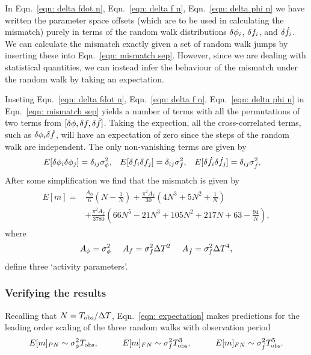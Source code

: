 In Eqn.~\eqref{eqn: delta fdot n}, Eqn.~\eqref{eqn: delta f n},
Eqn.~\eqref{eqn: delta phi n} we have written the parameter space offsets
(which are to be used in calculating the mismatch) purely in terms of the
random walk distributions $\delta \phi_i$, $\delta f_i$, and $\delta \dot{f}_i$. We can
calculate the mismatch exactly given a set of random walk jumps by inserting
these into Eqn.~\eqref{eqn: mismatch sep}. However, since we are dealing with
statistical quantities, we can instead infer the behaviour of the mismatch
under the random walk by taking an expectation.

Inseting Eqn.~\eqref{eqn: delta fdot n}, Eqn.~\eqref{eqn: delta f n},
Eqn.~\eqref{eqn: delta phi n}  in Eqn.~\eqref{eqn: mismatch sep} yields a
number of terms with all the permutations of two terms from $[\delta \phi, \delta f,
\delta \dot{f}]$. Taking the expection, all the cross-correlated terms, such as
$\delta\phi_{i}\delta \dot{f}$, will have an expectation of zero since the steps of the
random walk are independent. The only non-vanishing terms are given by
\begin{align}
E[\delta\phi_{i}\delta\phi_{j}] &= \delta_{ij}\sigma_{\phi}^{2}, &
E[\delta f_{i}\delta f_{j}] &= \delta_{ij}\sigma_{f}^{2},&
E[\delta\dot{f}_{i}\delta\dot{f}_{j}] &= \delta_{ij}\sigma_{\dot{f}}^{2},
\end{align}
After some simplification we find that the mismatch is given by
\begin{align}
\begin{split}
E[m]   = &  \frac{A_{\phi}}{6} \left(N - \frac{1}{N}\right)
+ \frac{\pi^{2} A_{{f}}}{30}\left(4 N^{3} + 5 N^{2} + \frac{1}{N}\right)\\
 & +  \frac{\pi^{2} A_{{\dot{f}}}}{3780} \left(66 N^{5} - 21 N^{3} + 105 N^{2}
 + 217 N + 63 - \frac{94}{N}\right),
\end{split}
\label{eqn: expectation}
\end{align}
where
\begin{equation}
	A_{\phi} = \sigma_{\phi}^{2} \;\;\;\;\;
    A_{f} = \sigma_{f}^{2}\Delta T^{2} \;\;\;\;\;
    A_{\dot{f}} = \sigma_{f}^{2}\Delta T^{4},
\end{equation}
define three `activity parameters'.

\subsubsection{Verifying the results}
Recalling that $N=T_{\mathrm{obs}}/\Delta T$, Eqn.~\eqref{eqn: expectation} makes
predictions for the leading order
scaling of the three random walks with observation period
\begin{equation}
E[m]_{PN} \sim \sigP \Tobs, \hspace{10mm}
E[m]_{FN} \sim \sigF \Tobs^{3}, \hspace{10mm}
E[m]_{FN} \sim \sigS \Tobs^{5}.
\end{equation}

